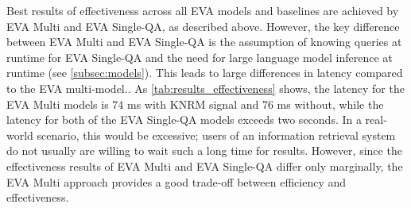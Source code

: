 \begin{enumerate}
    Best results of effectiveness across all EVA models and baselines are achieved by EVA Multi and EVA Single-QA, as described above. However, the key difference between EVA Multi and EVA Single-QA is the assumption of knowing queries at runtime for EVA Single-QA and the need for large language model inference at runtime (see \autoref{subsec:models}). This leads to large differences in latency compared to the EVA multi-model.. As \autoref{tab:results_effectiveness} shows, the latency for the EVA Multi models is 74 ms with KNRM signal and 76 ms without, while the latency for both of the EVA Single-QA models exceeds two seconds. In a real-world scenario, this would be excessive; users of an information retrieval system do not usually are willing to wait such a long time for results. However, since the effectiveness results of EVA Multi and EVA Single-QA differ only marginally, the EVA Multi approach provides a good trade-off between efficiency and effectiveness.
\end{enumerate}